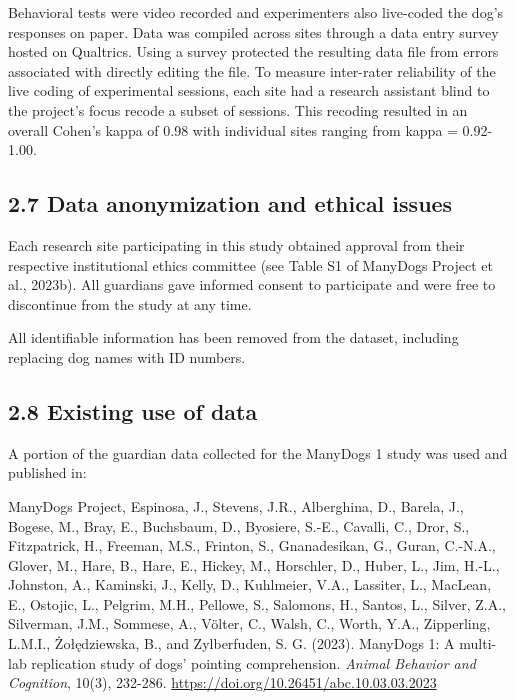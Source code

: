 \documentclass[
  man,floatsintext]{apa6}
\begin{document}
Behavioral tests were video recorded and experimenters also live-coded the dog's responses on paper. Data was compiled across sites through a data entry survey hosted on Qualtrics. Using a survey protected the resulting data file from errors associated with directly editing the file. To measure inter-rater reliability of the live coding of experimental sessions, each site had a research assistant blind to the project's focus recode a subset of sessions. This recoding resulted in an overall Cohen's kappa of 0.98 with individual sites ranging from kappa = 0.92-1.00.

\hypertarget{data-anonymization-and-ethical-issues}{%
\subsection{2.7 Data anonymization and ethical issues}\label{data-anonymization-and-ethical-issues}}

Each research site participating in this study obtained approval from their respective institutional ethics committee (see Table S1 of ManyDogs Project et al., 2023b). All guardians gave informed consent to participate and were free to discontinue from the study at any time.

All identifiable information has been removed from the dataset, including replacing dog names with ID numbers.

\hypertarget{existing-use-of-data}{%
\subsection{2.8 Existing use of data}\label{existing-use-of-data}}

A portion of the guardian data collected for the ManyDogs 1 study was used and published in:

ManyDogs Project, Espinosa, J., Stevens, J.R., Alberghina, D., Barela, J., Bogese, M., Bray, E., Buchsbaum, D., Byosiere, S.-E., Cavalli, C., Dror, S., Fitzpatrick, H., Freeman, M.S., Frinton, S., Gnanadesikan, G., Guran, C.-N.A., Glover, M., Hare, B., Hare, E., Hickey, M., Horschler, D., Huber, L., Jim, H.-L., Johnston, A., Kaminski, J., Kelly, D., Kuhlmeier, V.A., Lassiter, L., MacLean, E., Ostojic, L., Pelgrim, M.H., Pellowe, S., Salomons, H., Santos, L., Silver, Z.A., Silverman, J.M., Sommese, A., Völter, C., Walsh, C.,
Worth, Y.A., Zipperling, L.M.I., Żołędziewska, B., and Zylberfuden, S. G. (2023). ManyDogs 1: A multi-lab replication study of dogs' pointing comprehension. \emph{Animal Behavior and Cognition}, 10(3), 232-286.
\url{https://doi.org/10.26451/abc.10.03.03.2023}
\end{document}
